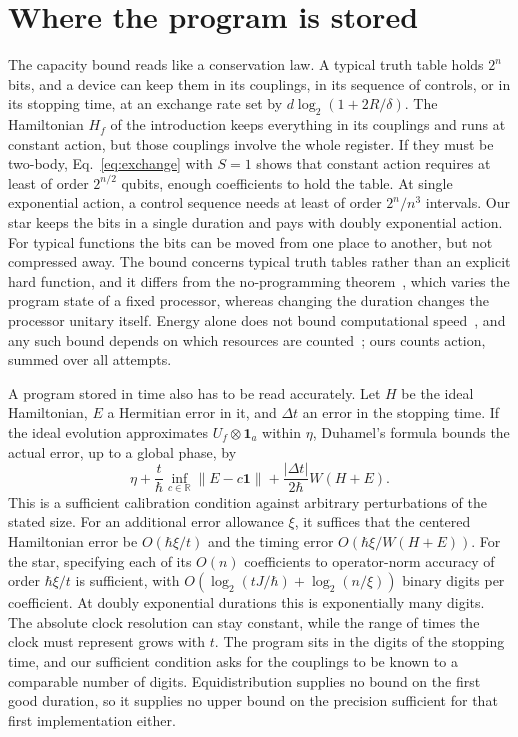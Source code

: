 \documentclass[11pt,a4paper]{article}
\providecommand{\openone}{\mathbf{1}}
\newcommand{\norm}[1]{\lVert #1\rVert}
\newcommand{\id}{\openone}
\begin{document}
\section{Where the program is stored}
\label{sec:precision}

The capacity bound reads like a conservation law. A typical truth table holds $2^n$ bits, and a device can keep them in its couplings, in its sequence of controls, or in its stopping time, at an exchange rate set by $d\log_2(1+2R/\delta)$. The Hamiltonian $H_f$ of the introduction keeps everything in its couplings and runs at constant action, but those couplings involve the whole register. If they must be two-body, Eq.~\eqref{eq:exchange} with $S=1$ shows that constant action requires at least of order $2^{n/2}$ qubits, enough coefficients to hold the table. At single exponential action, a control sequence needs at least of order $2^n/n^3$ intervals. Our star keeps the bits in a single duration and pays with doubly exponential action. For typical functions the bits can be moved from one place to another, but not compressed away. The bound concerns typical truth tables rather than an explicit hard function, and it differs from the no-programming theorem~\cite{Nielsen1997}, which varies the program state of a fixed processor, whereas changing the duration changes the processor unitary itself. Energy alone does not bound computational speed~\cite{Jordan2017}, and any such bound depends on which resources are counted~\cite{Russell2017,Bournez2021}; ours counts action, summed over all attempts.

A program stored in time also has to be read accurately. Let $H$ be the ideal Hamiltonian, $E$ a Hermitian error in it, and $\Delta t$ an error in the stopping time. If the ideal evolution approximates $U_f\otimes\id_a$ within $\eta$, Duhamel's formula bounds the actual error, up to a global phase, by
\begin{equation}
 \eta+\frac{t}{\hbar}\inf_{c\in\mathbb R}\norm{E-c\id}+\frac{|\Delta t|}{2\hbar}W(H+E) .
 \label{eq:stability}
\end{equation}
This is a sufficient calibration condition against arbitrary perturbations of the stated size. For an additional error allowance $\xi$, it suffices that the centered Hamiltonian error be $O(\hbar\xi/t)$ and the timing error $O(\hbar\xi/W(H+E))$. For the star, specifying each of its $O(n)$ coefficients to operator-norm accuracy of order $\hbar\xi/t$ is sufficient, with $O(\log_2(tJ/\hbar)+\log_2(n/\xi))$ binary digits per coefficient. At doubly exponential durations this is exponentially many digits. The absolute clock resolution can stay constant, while the range of times the clock must represent grows with $t$. The program sits in the digits of the stopping time, and our sufficient condition asks for the couplings to be known to a comparable number of digits. Equidistribution supplies no bound on the first good duration, so it supplies no upper bound on the precision sufficient for that first implementation either.
\end{document}
